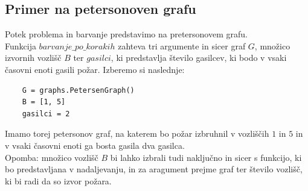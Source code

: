 \documentclass[a4paper, 12pt]{article}
\begin{document}
\subsection{Primer na petersonoven grafu}
\noindent Potek problema in barvanje predstavimo na pretersonovem grafu. \\ 
Funkcija $barvanje\_po\_korakih$ zahteva tri argumente
in sicer graf $G$, množico izvornih vozlišč $B$ ter $gasilci$, ki predstavlja število gasilcev, ki 
bodo v vsaki časovni enoti gasili požar.
Izberemo si naslednje:
\begin{verbatim}
    G = graphs.PetersenGraph()
    B = [1, 5]
    gasilci = 2
\end{verbatim}
Imamo torej petersonov graf, na katerem bo požar izbruhnil v vozliščih $1$ in $5$ in v vsaki časovni enoti ga bosta
gasila dva gasilca. \\
Opomba: množico vozlišč $B$ bi lahko izbrali tudi naključno in sicer s funkcijo, ki bo predstavljana
v nadaljevanju, in za aragument prejme graf ter število vozlišč, ki bi radi da so izvor požara. \\
\end{document}
